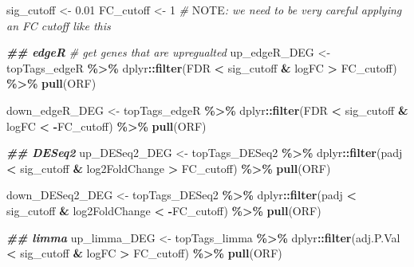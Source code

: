 \documentclass[
]{book}
\newenvironment{Shaded}{\begin{snugshade}}{\end{snugshade}}
\newcommand{\AlertTok}[1]{\textcolor[rgb]{0.94,0.16,0.16}{#1}}
\newcommand{\CommentTok}[1]{\textcolor[rgb]{0.56,0.35,0.01}{\textit{#1}}}
\newcommand{\DecValTok}[1]{\textcolor[rgb]{0.00,0.00,0.81}{#1}}
\newcommand{\DocumentationTok}[1]{\textcolor[rgb]{0.56,0.35,0.01}{\textbf{\textit{#1}}}}
\newcommand{\FloatTok}[1]{\textcolor[rgb]{0.00,0.00,0.81}{#1}}
\newcommand{\FunctionTok}[1]{\textcolor[rgb]{0.13,0.29,0.53}{\textbf{#1}}}
\newcommand{\NormalTok}[1]{#1}
\newcommand{\OtherTok}[1]{\textcolor[rgb]{0.56,0.35,0.01}{#1}}
\newcommand{\SpecialCharTok}[1]{\textcolor[rgb]{0.81,0.36,0.00}{\textbf{#1}}}
\begin{document}
\begin{Shaded}
\begin{Highlighting}[]
\NormalTok{sig\_cutoff }\OtherTok{\textless{}{-}} \FloatTok{0.01}
\NormalTok{FC\_cutoff }\OtherTok{\textless{}{-}} \DecValTok{1}
\CommentTok{\# }\AlertTok{NOTE}\CommentTok{: we need to be very careful applying an FC cutoff like this}

\DocumentationTok{\#\# edgeR}
\CommentTok{\# get genes that are upregualted}
\NormalTok{up\_edgeR\_DEG }\OtherTok{\textless{}{-}}\NormalTok{ topTags\_edgeR }\SpecialCharTok{\%\textgreater{}\%}
\NormalTok{  dplyr}\SpecialCharTok{::}\FunctionTok{filter}\NormalTok{(FDR }\SpecialCharTok{\textless{}}\NormalTok{ sig\_cutoff }\SpecialCharTok{\&}\NormalTok{ logFC }\SpecialCharTok{\textgreater{}}\NormalTok{ FC\_cutoff) }\SpecialCharTok{\%\textgreater{}\%}
  \FunctionTok{pull}\NormalTok{(ORF)}

\NormalTok{down\_edgeR\_DEG }\OtherTok{\textless{}{-}}\NormalTok{ topTags\_edgeR }\SpecialCharTok{\%\textgreater{}\%}
\NormalTok{  dplyr}\SpecialCharTok{::}\FunctionTok{filter}\NormalTok{(FDR }\SpecialCharTok{\textless{}}\NormalTok{ sig\_cutoff }\SpecialCharTok{\&}\NormalTok{ logFC }\SpecialCharTok{\textless{}} \SpecialCharTok{{-}}\NormalTok{FC\_cutoff) }\SpecialCharTok{\%\textgreater{}\%}
  \FunctionTok{pull}\NormalTok{(ORF)}

\DocumentationTok{\#\# DESeq2}
\NormalTok{up\_DESeq2\_DEG }\OtherTok{\textless{}{-}}\NormalTok{ topTags\_DESeq2 }\SpecialCharTok{\%\textgreater{}\%}
\NormalTok{  dplyr}\SpecialCharTok{::}\FunctionTok{filter}\NormalTok{(padj }\SpecialCharTok{\textless{}}\NormalTok{ sig\_cutoff }\SpecialCharTok{\&}\NormalTok{ log2FoldChange }\SpecialCharTok{\textgreater{}}\NormalTok{ FC\_cutoff) }\SpecialCharTok{\%\textgreater{}\%}
  \FunctionTok{pull}\NormalTok{(ORF)}

\NormalTok{down\_DESeq2\_DEG }\OtherTok{\textless{}{-}}\NormalTok{ topTags\_DESeq2 }\SpecialCharTok{\%\textgreater{}\%}
\NormalTok{  dplyr}\SpecialCharTok{::}\FunctionTok{filter}\NormalTok{(padj }\SpecialCharTok{\textless{}}\NormalTok{ sig\_cutoff }\SpecialCharTok{\&}\NormalTok{ log2FoldChange }\SpecialCharTok{\textless{}} \SpecialCharTok{{-}}\NormalTok{FC\_cutoff) }\SpecialCharTok{\%\textgreater{}\%}
  \FunctionTok{pull}\NormalTok{(ORF)}

\DocumentationTok{\#\# limma}
\NormalTok{up\_limma\_DEG }\OtherTok{\textless{}{-}}\NormalTok{ topTags\_limma }\SpecialCharTok{\%\textgreater{}\%}
\NormalTok{  dplyr}\SpecialCharTok{::}\FunctionTok{filter}\NormalTok{(adj.P.Val }\SpecialCharTok{\textless{}}\NormalTok{ sig\_cutoff }\SpecialCharTok{\&}\NormalTok{ logFC }\SpecialCharTok{\textgreater{}}\NormalTok{ FC\_cutoff) }\SpecialCharTok{\%\textgreater{}\%}
  \FunctionTok{pull}\NormalTok{(ORF)}


\end{Highlighting}
\end{Shaded}
\end{document}
